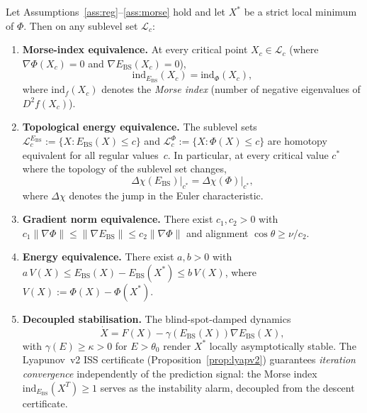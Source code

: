 \documentclass[final]{siamltex}
\newcommand{\norm}[1]{\lVert #1 \rVert}
\providecommand{\grad}{\nabla}
\newcommand{\Ebs}{E_{\mathrm{BS}}}
\newcommand{\Xst}{X^*}
\newcommand{\costheta}{\cos\theta}
\begin{document}
\begin{theorem}\label{thm:equiv}
Let Assumptions~\ref{ass:reg}--\ref{ass:morse} hold and let $\Xst$
be a strict local minimum of $\Phi$. Then on any sublevel set
$\mathcal{L}_c$:

\begin{enumerate}
\item[\textup{(C1)}] \textbf{Morse-index equivalence.}
  At every critical point $X_c\in\mathcal{L}_c$
  (where $\grad\Phi(X_c)=0$ and $\grad\Ebs(X_c)=0$),
  \begin{equation}\label{eq:morse_index}
    \mathrm{ind}_{\Ebs}(X_c) = \mathrm{ind}_{\Phi}(X_c),
  \end{equation}
  where $\mathrm{ind}_f(X_c)$ denotes the \emph{Morse index}
  (number of negative eigenvalues of $D^2 f(X_c)$).

\item[\textup{(C2)}] \textbf{Topological energy equivalence.}
  The sublevel sets $\mathcal{L}_c^{\Ebs}:=\{X:\Ebs(X)\le c\}$
  and $\mathcal{L}_c^{\Phi}:=\{X:\Phi(X)\le c\}$ are homotopy
  equivalent for all regular values~$c$. In particular, at every
  critical value $c^*$ where the topology of the sublevel set
  changes,
  \begin{equation}\label{eq:euler_jump}
    \Delta\chi(\Ebs)\big|_{c^*}
    = \Delta\chi(\Phi)\big|_{c^*},
  \end{equation}
  where $\Delta\chi$ denotes the jump in the Euler
  characteristic.

\item[\textup{(C3)}] \textbf{Gradient norm equivalence.} There
  exist $c_1,c_2>0$ with
  $c_1\norm{\grad\Phi}\le\norm{\grad\Ebs}\le c_2\norm{\grad\Phi}$
  and alignment $\costheta\ge\nu/c_2$.

\item[\textup{(C4)}] \textbf{Energy equivalence.} There exist
  $a,b>0$ with $a\,V(X)\le\Ebs(X)-\Ebs(\Xst)\le b\,V(X)$,
  where $V(X):=\Phi(X)-\Phi(\Xst)$.

\item[\textup{(C5)}] \textbf{Decoupled stabilisation.} The
  blind-spot-damped dynamics
  \begin{equation}\label{eq:bsdamped}
    \dot{X}=F(X)-\gamma(\Ebs(X))\grad\Ebs(X),
  \end{equation}
  with $\gamma(E)\ge\kappa>0$ for $E>\theta_0$ render $\Xst$
  locally asymptotically stable.  The Lyapunov~v2 ISS
  certificate (Proposition~\ref{prop:lyapv2}) guarantees
  \emph{iteration convergence} independently of the prediction
  signal: the Morse index $\mathrm{ind}_{\Ebs}(X^T)\ge 1$
  serves as the instability alarm, decoupled from the descent
  certificate.
\end{enumerate}
\end{theorem}
\end{document}
